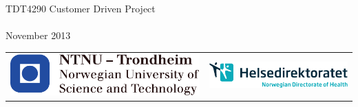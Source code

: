 \documentclass[11pt, a4paper, oneside]{Thesis} %
\begin{document}
\begin{titlepage}
\begin{center}
TDT4290 Customer Driven Project\\
\groupname\\
 
{\large November 2013}\\[1cm] %

\begin{tabular}{lr}
   \includegraphics[scale=0.6]{./Figures/NTNU-logo.pdf} 
   \hspace{3 cm} &
   \includegraphics[scale=0.9]{./Figures/HDIR-LOGO-HORISONTAL-ENG-CMYK.pdf} \\
\end{tabular}
\end{center}
\end{titlepage}
\clearpage %


\end{document}
